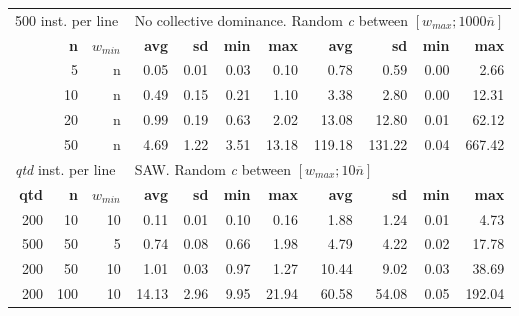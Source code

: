 \documentclass[runningheads,a4paper]{llncs}
\begin{document}
\begin{centering}
\begin{table}
\begin{tabular}{@{\extracolsep{4pt}}rrrrrrrrrrr@{}}
\multicolumn{3}{l}{500 inst. per line} & \multicolumn{8}{l}{No collective dominance. Random \emph{c} between \([w_{max}; 1000\overline{n}]\)}\\
\cline{1-3}\cline{4-11}
& \textbf{n} & \(w_{min}\) & \textbf{avg} & \textbf{sd} & \textbf{min} & \textbf{max} & \textbf{avg} & \textbf{sd} & \textbf{min} & \textbf{max}\\
\cline{1-3}\cline{4-7}\cline{8-11}
&  5 & n & 0.05 & 0.01 & 0.03 & 0.10 & 0.78 & 0.59 & 0.00 & 2.66\\
& 10 & n & 0.49 & 0.15 & 0.21 & 1.10 & 3.38 & 2.80 & 0.00 & 12.31\\
& 20 & n & 0.99 & 0.19 & 0.63 & 2.02 & 13.08 & 12.80 & 0.01 & 62.12\\
& 50 & n & 4.69 & 1.22 & 3.51 & 13.18 & 119.18 & 131.22 & 0.04 & 667.42\\
\hline

\multicolumn{3}{l}{\emph{qtd} inst. per line} & \multicolumn{8}{l}{SAW. Random \emph{c} between \([w_{max}; 10\overline{n}]\)}\\
\cline{1-3}\cline{4-11}
\textbf{qtd} & \textbf{n} & \(w_{min}\) & \textbf{avg} & \textbf{sd} & \textbf{min} & \textbf{max} & \textbf{avg} & \textbf{sd} & \textbf{min} & \textbf{max}\\
\cline{1-3}\cline{4-7}\cline{8-11}
~200 &  10 & 10 & 0.11 & 0.01 & 0.10 & 0.16 & 1.88 & 1.24 & 0.01 & 4.73\\
~500 &  50 &  5 & 0.74 & 0.08 & 0.66 & 1.98 & 4.79 & 4.22 & 0.02 & 17.78\\
~200 &  50 & 10 & 1.01 & 0.03 & 0.97 & 1.27 & 10.44 & 9.02 & 0.03 & 38.69\\
~200 & 100 & 10 & 14.13 & 2.96 & 9.95 & 21.94 & 60.58 & 54.08 & 0.05 & 192.04\\
\hline

\end{tabular}
\end{table}
\end{centering}
\end{document}
